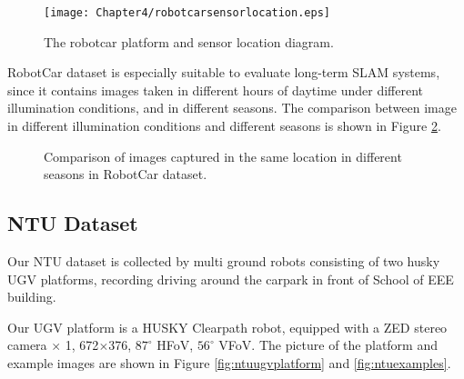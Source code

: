 \begin{figure}[H]
	\centering
	\texttt{[image: Chapter4/robotcarsensorlocation.eps]}
	\caption{The robotcar platform and sensor location diagram.}
	\label{fig:robotcarsensorlocation} 
\end{figure}

RobotCar dataset is especially suitable to evaluate long-term SLAM systems, since it contains images taken in different hours of daytime under different illumination conditions, and in different seasons. The comparison between image in different illumination conditions and different seasons is shown in Figure \ref{fig:robotcarcomparisonseason}.

\begin{figure}
	\centering
	\caption{Comparison of images captured in the same location in different seasons in RobotCar dataset.}
	\label{fig:robotcarcomparisonseason}
\end{figure}
	
\subsection{NTU Dataset}
\label{sec:ntuinfo}
Our NTU dataset \cite{zhang2018two} is collected by multi ground robots consisting of two husky UGV platforms, recording driving around the carpark in front of School of EEE building.

Our UGV platform is a HUSKY Clearpath robot, equipped with a ZED stereo camera $\times$ 1, 672$\times$376, $87^{\circ}$ HFoV, $56^{\circ}$ VFoV. The picture of the platform and example images are shown in Figure \ref{fig:ntuugvplatform} and \ref{fig:ntuexamples}.


